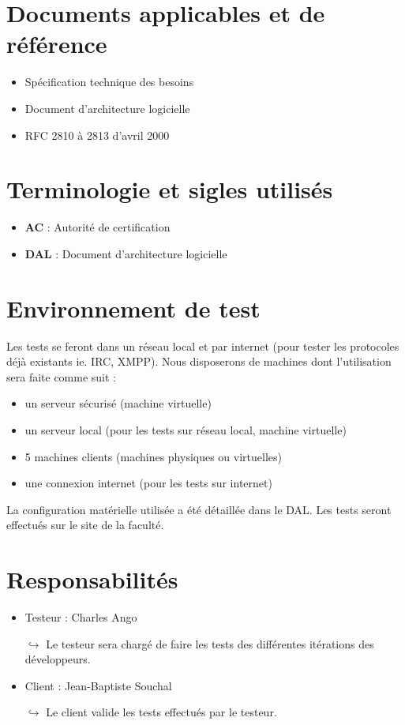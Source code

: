 \documentclass[a4paper,11pt,french]{article}
\begin{document}
\section{Documents applicables et de référence}
\begin{itemize}
\item Spécification technique des besoins
\item Document d'architecture logicielle
\item RFC 2810 à 2813 d'avril 2000
\end{itemize}

\section{Terminologie et sigles utilisés}
\begin{itemize}
\item \textbf{AC} : Autorité de certification
\item \textbf{DAL} : Document d'architecture logicielle
\end{itemize}

\section{Environnement de test}
Les tests se feront dans un réseau local et par internet (pour tester les protocoles déjà existants ie. IRC, XMPP). Nous disposerons de  machines dont l’utilisation sera faite comme suit :
\begin{itemize}
\item un serveur sécurisé (machine virtuelle)
\item un serveur local (pour les tests sur réseau local, machine virtuelle)
\item 5 machines clients (machines physiques ou virtuelles)
\item une connexion internet (pour les tests sur internet)
\end{itemize}
La configuration matérielle utilisée a été détaillée dans le DAL. Les tests seront effectués sur le site de la faculté.

\section{Responsabilités}
\begin{itemize}
\item Testeur : Charles Ango
\item [$\hookrightarrow$] Le testeur sera chargé de faire les tests des différentes itérations des développeurs.
\item Client : Jean-Baptiste Souchal
\item [$\hookrightarrow$] Le client valide les tests effectués par le testeur.
\end{itemize}
\end{document}
